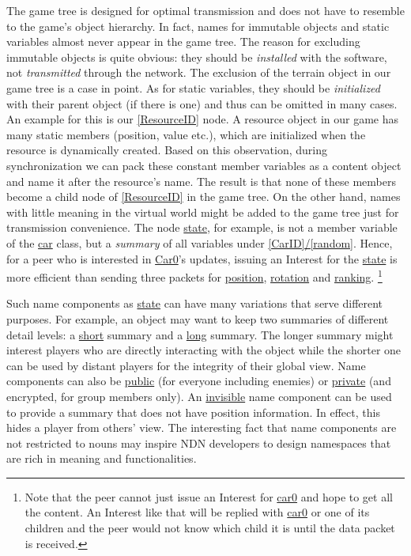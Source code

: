 \documentclass{sigchi}
\begin{document}
The game tree is designed for optimal transmission and does not have to resemble to the game's object hierarchy. In fact, names for immutable objects and static variables almost never appear in the game tree. The reason for excluding immutable objects is quite obvious: they should be \emph{installed} with the software, not \emph{transmitted} through the network. The exclusion of the terrain object in our game tree is a case in point. As for static variables, they should be \emph{initialized} with their parent object (if there is one) and thus can be omitted in many cases. An example for this is our \url{[ResourceID]} node. A resource object in our game has many static members (position, value etc.), which are initialized when the resource is dynamically created. Based on this observation, during synchronization we can pack these constant member variables as a content object and name it after the resource's name. The result is that none of these members become a child node of \url{[ResourceID]} in the game tree. On the other hand, names with little meaning in the virtual world might be added to the game tree just for transmission convenience. The node \url{state}, for example, is not a member variable of the \url{car} class, but a \emph{summary} of all variables under \url{[CarID]/[random]}. 
Hence, for a peer who is interested in \url{Car0}'s updates, issuing an Interest for the \url{state} is more efficient than sending three packets for \url{position}, \url{rotation} and \url{ranking}.
\footnote{Note that the peer cannot just issue an Interest for \url{car0} and hope to get all the content. An Interest like that will be replied with \url{car0} or one of its children and the peer would not know which child it is until the data packet is received.}

Such name components as \url{state} can have many variations that serve different purposes. For example, an object may want to keep two summaries of different detail levels: a \url{short} summary and a \url{long} summary. The longer summary might interest players who are directly interacting with the object while the shorter one can be used by distant players for the integrity of their global view. Name components can also be \url{public} (for everyone including enemies) or \url{private} (and encrypted, for group members only). An \url{invisible} name component can be used to provide a summary that does not have position information. In effect, this hides a player from others' view. The interesting fact that name components are not restricted to nouns may inspire NDN developers to design namespaces that are rich in meaning and functionalities.
\end{document}
